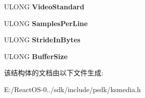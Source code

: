 \begin{DoxyCompactItemize}
\item 
\mbox{\label{structtag_k_s___v_b_i_i_n_f_o_h_e_a_d_e_r_a08275832c5cc4c4ac64b356bc4629f1e}} 
U\+L\+O\+NG {\bfseries Video\+Standard}
\item 
\mbox{\label{structtag_k_s___v_b_i_i_n_f_o_h_e_a_d_e_r_a0d21941f9eadb8d64d1842ca837a7144}} 
U\+L\+O\+NG {\bfseries Samples\+Per\+Line}
\item 
\mbox{\label{structtag_k_s___v_b_i_i_n_f_o_h_e_a_d_e_r_a12b3e9d6beb8fb299effa817517e3998}} 
U\+L\+O\+NG {\bfseries Stride\+In\+Bytes}
\item 
\mbox{\label{structtag_k_s___v_b_i_i_n_f_o_h_e_a_d_e_r_ae34059e9ef8f312fcef606db0b68c3e9}} 
U\+L\+O\+NG {\bfseries Buffer\+Size}
\end{DoxyCompactItemize}


该结构体的文档由以下文件生成\+:\begin{DoxyCompactItemize}
\item 
E\+:/\+React\+O\+S-\/0../sdk/include/psdk/ksmedia.\+h\end{DoxyCompactItemize}
